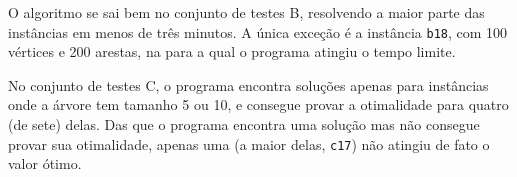 \documentclass{article}
\begin{document}
O algoritmo se sai bem no conjunto de testes B, resolvendo a maior parte das
instâncias em menos de três minutos. A única exceção é a instância {\tt b18},
com 100 vértices e 200 arestas, na para a qual o programa atingiu o tempo limite.

No conjunto de testes C, o programa encontra soluções apenas para instâncias onde a árvore tem tamanho 5 ou 10, e
consegue provar a otimalidade para quatro (de sete) delas. Das que o programa encontra uma solução mas não consegue
provar sua otimalidade, apenas uma (a maior delas, {\tt c17}) não atingiu de fato o valor ótimo.
\end{document}
